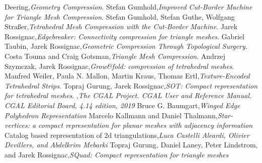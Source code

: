 \documentclass[a4paper,11pt,openany]{article}
\begin{document}
\begin{thebibliography}{999}
Deering,\emph{Geometry Compression}. 
Stefan Gumhold,\emph{Improved Cut-Border Machine for Triangle Mesh Compression}. 
Stefan Gumhold, Stefan Guthe, Wolfgang Straßer,\emph{Tetrahedral Mesh Compression with the Cut-Border Machine}. 
Jarek Rossignac,\emph{Edgebreaker: Connectivity compression for triangle meshes}. 
Gabriel Taubin, Jarek Rossignac,\emph{Geometric Compression Through Topological Surgery}. 
Costa Touma and Craig Gotsman,\emph{Triangle Mesh Compression}. 
Andrzej Szymczak, Jarek Rossignac,\emph{Grow\&fold: compression of tetrahedral meshes}. 
Manfred Weiler, Paula N. Mallon, Martin Kraus, Thomas Ertl,\emph{Texture-Encoded Tetrahedral Strips}. 
Topraj Gurung, Jarek Rossignac,\emph{SOT: Compact representation for tetrahedral meshes}. 
,\emph{The CGAL Project. CGAL User and Reference Manual. CGAL Editorial Board, 4.14 edition, 2019}
Bruce G. Baumgart,\emph{Winged Edge Polyhedron Representation}
Marcelo Kallmann and Daniel Thalmann,\emph{Star-vertices: a compact representation for planar meshes with adjacency information}
Catalog based representation of 2d triangulations,\emph{Luca Castelli Aleardi, Olivier Devillers, and Abdelkrim Mebarki}
Topraj Gurung, Daniel Laney, Peter Lindstrom, and Jarek Rossignac,\emph{SQuad: Compact representation for triangle meshes}


\end{thebibliography}
\end{document}
